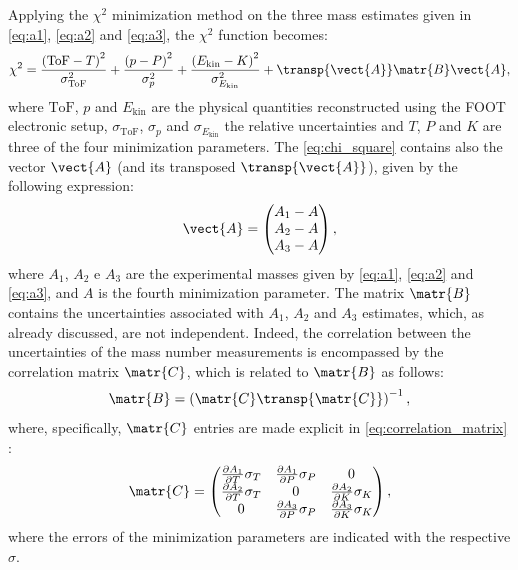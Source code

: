 Applying the $\chi^2$ minimization method on the three mass estimates given in \autoref{eq:a1}, \autoref{eq:a2} and \autoref{eq:a3}, the $\chi^2$ function becomes:
\begin{equation}
	\chi^2=\frac{\left(\text{ToF}-T\right)^2}{\sigma^2_{\text{ToF}}}+\frac{\left(p-P\right)^2}{\sigma^2_{p}}+\frac{\left(E_\text{kin}-K\right)^2}{\sigma^2_{E_\text{kin}}}+\transp{\vect{A}}\matr{B}\vect{A},
	\label{eq:chi_square}
\end{equation}
where $\text{ToF}$, $p$ and $E_\text{kin}$ are the physical quantities reconstructed using the FOOT electronic setup, $\sigma_{\text{ToF}}$, $\sigma_{p}$ and $\sigma_{E_\text{kin}}$ the relative uncertainties and $T$, $P$ and $K$ are three of the four minimization parameters. The \autoref{eq:chi_square} contains also the vector $\vect{A}$ (and its transposed $\transp{\vect{A}}$), given by the following expression:
\begin{equation}
	\vect{A}=
	\begin{pmatrix}
		A_1-A\\
		A_2-A \\
		A_3-A\\
	\end{pmatrix}
	,
	\label{eq:vector_A}
\end{equation}
where $A_1$, $A_2$ e $A_3$ are the experimental masses given by \autoref{eq:a1}, \autoref{eq:a2} and \autoref{eq:a3}, and $A$ is the fourth minimization parameter. The matrix $\matr{B}$ contains the uncertainties associated with $A_1$, $A_2$ and $A_3$ estimates, which, as already discussed, are not independent. Indeed, the correlation between the uncertainties of the mass number measurements is encompassed by the correlation matrix $\matr{C}$, which is related to $\matr{B}$ as follows:
\begin{equation}
	\matr{B}=\left(\matr{C}\transp{\matr{C}}\right)^{-1},
	\label{eq:B_funct_C}
\end{equation}
where, specifically, $\matr{C}$ entries are made explicit in \autoref{eq:correlation_matrix} \cite{foot_cdr,valle2019design}:
\begin{equation}
	\matr{C}=
	\begin{pmatrix}
		\frac{\partial A_1}{\partial T}\sigma_T&\frac{\partial A_1}{\partial P}\sigma_P&0\\
		\frac{\partial A_2}{\partial T}\sigma_T&0&\frac{\partial A_2}{\partial K}\sigma_K\\
		0&\frac{\partial A_3}{\partial P}\sigma_P&\frac{\partial A_3}{\partial K}\sigma_K\\
	\end{pmatrix}
	,
	\label{eq:correlation_matrix}
\end{equation}
where the errors of the minimization parameters are indicated with the respective $\sigma$.

